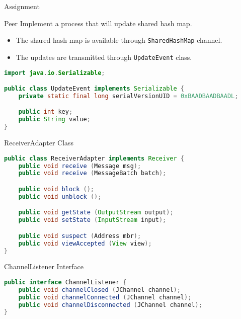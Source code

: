 \begin{frame}[fragile]{Assignment}
    \begin{block}{Peer}
        Implement a process that will update shared hash map.
        \begin{itemize}
            \item The shared hash map is available through \lstinline{SharedHashMap} channel.
            \item The updates are transmitted through \lstinline{UpdateEvent} class.
        \end{itemize}
    \end{block}

\begin{lstlisting}[language=java,style=mini]
import java.io.Serializable;

public class UpdateEvent implements Serializable {
    private static final long serialVersionUID = 0xBAADBAADBAADL;

    public int key;
    public String value;
}
\end{lstlisting}
\end{frame}


\begin{frame}[fragile]{ReceiverAdapter Class}
\begin{lstlisting}[language=java,style=mini]
public class ReceiverAdapter implements Receiver {
    public void receive (Message msg);
    public void receive (MessageBatch batch);

    public void block ();
    public void unblock ();

    public void getState (OutputStream output);
    public void setState (InputStream input);

    public void suspect (Address mbr);
    public void viewAccepted (View view);
}
\end{lstlisting}
\end{frame}


\begin{frame}[fragile]{ChannelListener Interface}
\begin{lstlisting}[language=java,style=mini]
public interface ChannelListener {
    public void channelClosed (JChannel channel);
    public void channelConnected (JChannel channel);
    public void channelDisconnected (JChannel channel);
}
\end{lstlisting}
\end{frame}


